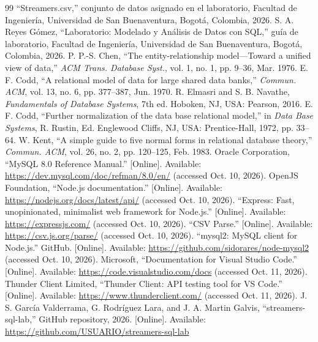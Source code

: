 \documentclass[conference]{IEEEtran}
\begin{document}
\begin{thebibliography}{99}
 ``Streamers.csv,'' conjunto de datos asignado en el laboratorio, Facultad de Ingeniería, Universidad de San Buenaventura, Bogotá, Colombia, 2026.
 S. A. Reyes Gómez, ``Laboratorio: Modelado y Análisis de Datos con SQL,'' guía de laboratorio, Facultad de Ingeniería, Universidad de San Buenaventura, Bogotá, Colombia, 2026.
 P. P.-S. Chen, ``The entity-relationship model---Toward a unified view of data,'' \emph{ACM Trans. Database Syst.}, vol. 1, no. 1, pp. 9--36, Mar. 1976.
 E. F. Codd, ``A relational model of data for large shared data banks,'' \emph{Commun. ACM}, vol. 13, no. 6, pp. 377--387, Jun. 1970.
 R. Elmasri and S. B. Navathe, \emph{Fundamentals of Database Systems}, 7th ed. Hoboken, NJ, USA: Pearson, 2016.
 E. F. Codd, ``Further normalization of the data base relational model,'' in \emph{Data Base Systems}, R. Rustin, Ed. Englewood Cliffs, NJ, USA: Prentice-Hall, 1972, pp. 33--64.
 W. Kent, ``A simple guide to five normal forms in relational database theory,'' \emph{Commun. ACM}, vol. 26, no. 2, pp. 120--125, Feb. 1983.
 Oracle Corporation, ``MySQL 8.0 Reference Manual.'' [Online]. Available: \url{https://dev.mysql.com/doc/refman/8.0/en/} (accessed Oct. 10, 2026).
 OpenJS Foundation, ``Node.js documentation.'' [Online]. Available: \url{https://nodejs.org/docs/latest/api/} (accessed Oct. 10, 2026).
 ``Express: Fast, unopinionated, minimalist web framework for Node.js.'' [Online]. Available: \url{https://expressjs.com/} (accessed Oct. 10, 2026).
 ``CSV Parse.'' [Online]. Available: \url{https://csv.js.org/parse/} (accessed Oct. 10, 2026).
 ``mysql2: MySQL client for Node.js.'' GitHub. [Online]. Available: \url{https://github.com/sidorares/node-mysql2} (accessed Oct. 10, 2026).
 Microsoft, ``Documentation for Visual Studio Code.'' [Online]. Available: \url{https://code.visualstudio.com/docs} (accessed Oct. 11, 2026).
 Thunder Client Limited, ``Thunder Client: API testing tool for VS Code.'' [Online]. Available: \url{https://www.thunderclient.com/} (accessed Oct. 11, 2026).
 J. S. García Valderrama, G. Rodríguez Lara, and J. A. Martin Galvis, ``streamers-sql-lab,'' GitHub repository, 2026. [Online]. Available: \url{https://github.com/USUARIO/streamers-sql-lab}
\end{thebibliography}
\end{document}
